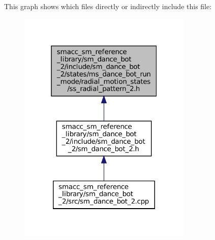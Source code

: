 This graph shows which files directly or indirectly include this file\+:
\nopagebreak
\begin{figure}[H]
\begin{center}
\leavevmode
\includegraphics[width=235pt]{sm__dance__bot__2_2include_2sm__dance__bot__2_2states_2ms__dance__bot__run__mode_2radial__motione47ebf41e16004b32e02da7875c74f44}
\end{center}
\end{figure}
